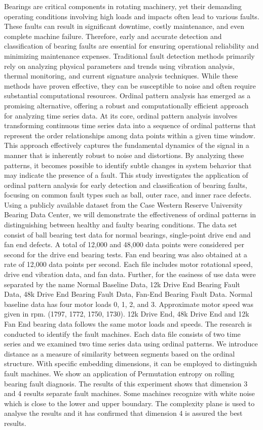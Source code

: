 \documentclass[sn-basic,pdflatex]{sn-jnl}
\theoremstyle{remark}
\theoremstyle{definition}
\begin{document}
Bearings are critical components in rotating machinery, yet their
demanding operating conditions involving high loads and impacts often
lead to various faults. These faults can result in significant downtime,
costly maintenance, and even complete machine failure. Therefore, early
and accurate detection and classification of bearing faults are
essential for ensuring operational reliability and minimizing
maintenance expenses. Traditional fault detection methods primarily rely
on analyzing physical parameters and trends using vibration analysis,
thermal monitoring, and current signature analysis techniques. While
these methods have proven effective, they can be susceptible to noise
and often require substantial computational resources. Ordinal pattern
analysis has emerged as a promising alternative, offering a robust and
computationally efficient approach for analyzing time series data. At
its core, ordinal pattern analysis involves transforming continuous time
series data into a sequence of ordinal patterns that represent the order
relationships among data points within a given time window. This
approach effectively captures the fundamental dynamics of the signal in
a manner that is inherently robust to noise and distortions. By
analyzing these patterns, it becomes possible to identify subtle changes
in system behavior that may indicate the presence of a fault. This study
investigates the application of ordinal pattern analysis for early
detection and classification of bearing faults, focusing on common fault
types such as ball, outer race, and inner race defects. Using a publicly
available dataset from the Case Western Reserve University Bearing Data
Center, we will demonstrate the effectiveness of ordinal patterns in
distinguishing between healthy and faulty bearing conditions. The data
set consist of ball bearing test data for normal bearings, single-point
drive end and fan end defects. A total of 12,000 and 48,000 data points
were considered per second for the drive end bearing tests. Fan end
bearing was also obtained at a rate of 12,000 data points per second.
Each file includes motor rotational speed, drive end vibration data, and
fan data. Further, for the easiness of use data were separated by the
name Normal Baseline Data, 12k Drive End Bearing Fault Data, 48k Drive
End Bearing Fault Data, Fan-End Bearing Fault Data. Normal baseline data
has four motor loads 0, 1, 2, and 3. Approximate motor speed was given
in rpm. (1797, 1772, 1750, 1730). 12k Drive End, 48k Drive End and 12k
Fan End bearing data follows the same motor loads and speeds. The
research is conducted to identify the fault machines. Each data file
consists of two time series and we examined two time series data using
ordinal patterns. We introduce distance as a measure of similarity
between segments based on the ordinal structure. With specific embedding
dimensions, it can be employed to distinguish fault machines. We show an
application of Permutation entropy on rolling bearing fault diagnosis.
The results of this experiment shows that dimension 3 and 4 results
separate fault machines. Some machines recognize with white noise which
is close to the lower and upper boundary. The complexity plane is used
to analyse the results and it has confirmed that dimension 4 is assured
the best results.
\end{document}
